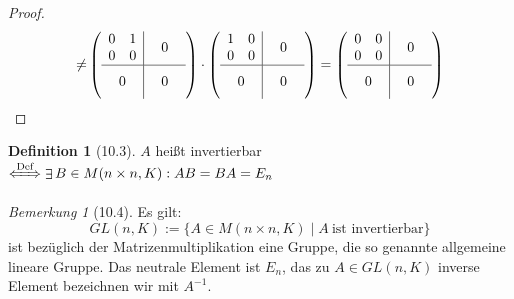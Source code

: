 \documentclass[a4paper]{scrartcl}
\DeclareMathOperator{\Exists}{\exists}
\theoremstyle{definition}
\newtheorem{defn}{Definition}
\theoremstyle{plain}
\theoremstyle{plain}
\theoremstyle{remark}
\newtheorem{remark}{Bemerkung}
\theoremstyle{remark}
\theoremstyle{remark}
\theoremstyle{remark}
\theoremstyle{remark}
\begin{document}
\begin{proof}
\begin{align*}
\neq&
\sbox0{$\begin{matrix} 1 & 0 \\ 0 & 0 \end{matrix}$}%
\sbox1{$\begin{matrix} 0 & 1 \\ 0 & 0 \end{matrix}$}%
\sbox2{$\begin{matrix} 0 & 0 \\ 0 & 0 \end{matrix}$}%
\left(
\begin{array}{c|c}
\usebox{1}&\makebox[\wd1]{$0$} \\
\hline
\vphantom{\usebox{1}}\makebox[\wd1]{$0$}&\makebox[\wd1]{$0$}
\end{array}
\right)
\cdot
\left(
\begin{array}{c|c}
\usebox{0}&\makebox[\wd0]{$0$} \\
\hline
\vphantom{\usebox{0}}\makebox[\wd0]{$0$}&\makebox[\wd0]{$0$}
\end{array}
\right)
=
\left(
\begin{array}{c|c}
\usebox{2}&\makebox[\wd1]{$0$} \\
\hline
\vphantom{\usebox{1}}\makebox[\wd1]{$0$}&\makebox[\wd1]{$0$}
\end{array}
\right) \\
\end{align*}
\end{proof}
\begin{defn}[10.3]
$A$ heißt invertierbar $\xLeftrightarrow{\text{Def}} \Exists B\in M(n\times n, K): AB = BA = E_n$
\end{defn}
\begin{remark}[10.4]
Es gilt:
\[GL(n, K) := \{A\in M(n\times n, K) \mid A ~\text{ist invertierbar}\}\]
ist bezüglich der Matrizenmultiplikation eine Gruppe, die so genannte allgemeine lineare Gruppe.
Das neutrale Element ist $E_n$, das zu $A\in GL(n,K)$ inverse Element bezeichnen wir mit $A^{-1}$.
\end{remark}
\end{document}

